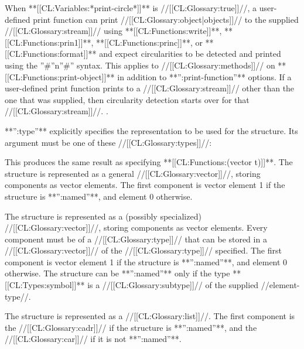 When **[[CL:Variables:*print-circle*]]** is //[[CL:Glossary:true]]//, a user-defined print function can print //[[CL:Glossary:object|objects]]// to the supplied //[[CL:Glossary:stream]]// using **[[CL:Functions:write]]**, **[[CL:Functions:prin1]]**, **[[CL:Functions:princ]]**, or **[[CL:Functions:format]]** and expect circularities to be detected and printed using the ''#''n''#'' syntax. This applies to //[[CL:Glossary:methods]]// on **[[CL:Functions:print-object]]** in addition to **'':print-function''** options. If a user-defined print function prints to a //[[CL:Glossary:stream]]// other than the one that was supplied, then circularity detection starts over for that //[[CL:Glossary:stream]]//. .




**'':type''** explicitly specifies the representation to be used for the structure. Its argument must be one of these //[[CL:Glossary:types]]//:

\beginlist


This produces the same result as specifying **[[CL:Functions:(vector t)]]**. The structure is represented as a general //[[CL:Glossary:vector]]//, storing components as vector elements. The first component is vector element 1 if the structure is **'':named''**, and element 0 otherwise.



The structure is represented as a (possibly specialized) //[[CL:Glossary:vector]]//, storing components as vector elements. Every component must be of a //[[CL:Glossary:type]]// that can be stored in a //[[CL:Glossary:vector]]// of the //[[CL:Glossary:type]]// specified. The first component is vector element 1 if the structure is **'':named''**, and element 0 otherwise. The structure can be **'':named''** only if the type **[[CL:Types:symbol]]** is a //[[CL:Glossary:subtype]]// of the supplied //element-type//.


The structure is represented as a //[[CL:Glossary:list]]//. The first component is the //[[CL:Glossary:cadr]]// if the structure is **'':named''**, and the //[[CL:Glossary:car]]// if it is not **'':named''**. \endlist

